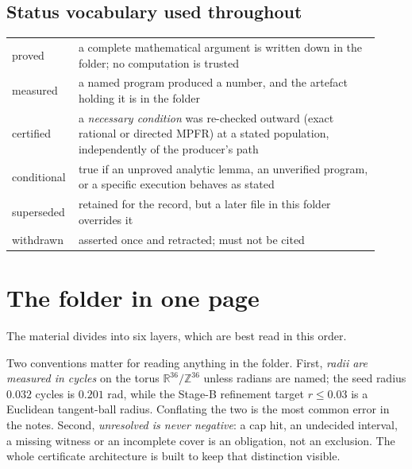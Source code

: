 \documentclass[10pt]{article}
\theoremstyle{definition}
\newcommand{\R}{\mathbb{R}}
\newcommand{\Z}{\mathbb{Z}}
\newcommand{\status}[1]{\textsf{\small #1}}
\begin{document}
\subsection*{Status vocabulary used throughout}
\begin{center}
\small
\begin{tabular}{@{}p{0.13\linewidth}p{0.79\linewidth}@{}}
\toprule
\status{proved} & a complete mathematical argument is written down in the folder; no computation is trusted \\
\status{measured} & a named program produced a number, and the artefact holding it is in the folder \\
\status{certified} & a \emph{${}$necessary condition} was re-checked outward (exact rational or directed
MPFR) at a stated population, independently of the producer's path \\
\status{conditional} & true if an unproved analytic lemma, an unverified program, or a specific execution behaves as stated \\
\status{superseded} & retained for the record, but a later file in this folder overrides it \\
\status{withdrawn} & asserted once and retracted; must not be cited \\
\bottomrule
\end{tabular}
\end{center}

\section{The folder in one page}

The material divides into six layers, which are best read in this order.



Two conventions matter for reading anything in the folder. First, \emph{radii are measured in cycles}
on the torus $\R^{36}/\Z^{36}$ unless radians are named; the seed radius $0.032$ cycles is $0.201$ rad,
while the Stage-B refinement target $r\le0.03$ is a Euclidean tangent-ball radius. Conflating the two
is the most common error in the notes. Second, \emph{unresolved is never negative}: a cap hit, an
undecided interval, a missing witness or an incomplete cover is an obligation, not an exclusion. The
whole certificate architecture is built to keep that distinction visible.
\end{document}
